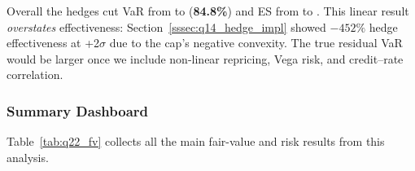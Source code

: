 \documentclass[11pt,a4paper]{article}
\begin{document}
Overall the hedges cut VaR from  to 
(\textbf{84.8\%}) and ES from  to .
This linear result \textit{overstates} effectiveness:
Section~\ref{sssec:q14_hedge_impl} showed $-452\%$ hedge
effectiveness at +2$\sigma$ due to the cap's negative convexity.
The true residual VaR would be larger once we include non-linear
repricing, Vega risk, and credit--rate correlation.

\subsubsection{Summary Dashboard}
\label{sssec:q22_summary}

Table~\ref{tab:q22_fv} collects all the main fair-value
and risk results from this analysis.
\end{document}
